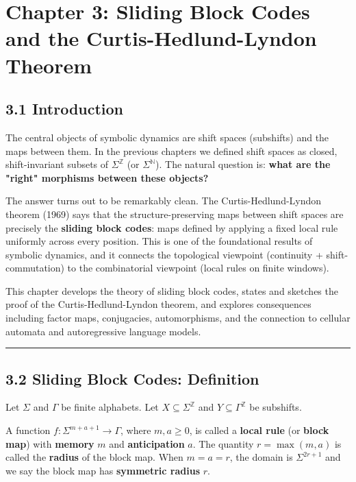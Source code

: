 \chapter{Chapter 3: Sliding Block Codes and the Curtis-Hedlund-Lyndon Theorem}

\section{3.1 Introduction}

The central objects of symbolic dynamics are shift spaces (subshifts) and the maps between them. In the previous chapters we defined shift spaces as closed, shift-invariant subsets of $\Sigma^\mathbb{Z}$ (or $\Sigma^\mathbb{N}$). The natural question is: \textbf{what are the "right" morphisms between these objects?}

The answer turns out to be remarkably clean. The Curtis-Hedlund-Lyndon theorem (1969) says that the structure-preserving maps between shift spaces are precisely the \textbf{sliding block codes}: maps defined by applying a fixed local rule uniformly across every position. This is one of the foundational results of symbolic dynamics, and it connects the topological viewpoint (continuity + shift-commutation) to the combinatorial viewpoint (local rules on finite windows).

This chapter develops the theory of sliding block codes, states and sketches the proof of the Curtis-Hedlund-Lyndon theorem, and explores consequences including factor maps, conjugacies, automorphisms, and the connection to cellular automata and autoregressive language models.

\bigskip\hrule\bigskip

\section{3.2 Sliding Block Codes: Definition}

Let $\Sigma$ and $\Gamma$ be finite alphabets. Let $X \subseteq \Sigma^\mathbb{Z}$ and $Y \subseteq \Gamma^\mathbb{Z}$ be subshifts.

\begin{definition}
A function $f: \Sigma^{m+a+1} \to \Gamma$, where $m, a \geq 0$, is called a \textbf{local rule} (or \textbf{block map}) with \textbf{memory} $m$ and \textbf{anticipation} $a$. The quantity $r = \max(m, a)$ is called the \textbf{radius} of the block map. When $m = a = r$, the domain is $\Sigma^{2r+1}$ and we say the block map has \textbf{symmetric radius} $r$.
\end{definition}


